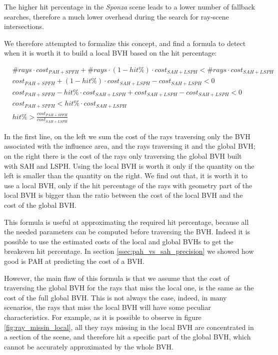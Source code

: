\documentclass{PoliMi_MasterThesis}
\begin{document}
The higher hit percentage in the \textit{Sponza} scene leads to a lower number of fallback searches, therefore a much lower overhead during the search for ray-scene intersections.

We therefore attempted to formalize this concept, and find a formula to detect when it is worth it to build a local BVH based on the hit percentage:

\begin{subequations}
	\begin{align*}
		&\#rays \cdot cost_{PAH+SPFH} + \#rays \cdot (1-hit\%) \cdot cost_{SAH+LSPH} < \#rays \cdot cost_{SAH+LSPH}\\
		&cost_{PAH+SPFH} + (1-hit\%) \cdot cost_{SAH+LSPH} - cost_{SAH+LSPH} < 0\\
		&cost_{PAH+SPFH} - hit\% \cdot cost_{SAH+LSPH} + cost_{SAH+LSPH} - cost_{SAH+LSPH} < 0\\
		&cost_{PAH+SPFH} < hit\% \cdot cost_{SAH+LSPH}\\
		&hit\% > \frac{cost_{PAH+SPFH}}{cost_{SAH+LSPH}}
	\end{align*}
\end{subequations}

In the first line, on the left we sum the cost of the rays traversing only the BVH associated with the influence area, and the rays traversing it and the global BVH; on the right there is the cost of the rays only traversing the global BVH built with SAH and LSPH. Using the local BVH is worth it only if the quantity on the left is smaller than the quantity on the right. We find out that, it is worth it to use a local BVH, only if the hit percentage of the rays with geometry part of the local BVH is bigger than the ratio between the cost of the local BVH and the cost of the global BVH.

This formula is useful at approximating the required hit percentage, because all the needed parameters can be computed before traversing the BVH. Indeed it is possible to use the estimated costs of the local and global BVHs to get the breakeven hit percentage. In section \ref{ssec:pah_vs_sah_precision} we showed how good is PAH at predicting the cost of a BVH.

However, the main flaw of this formula is that we assume that the cost of traversing the global BVH for the rays that miss the local one, is the same as the cost of the full global BVH. This is not always the case, indeed, in many scenarios, the rays that miss the local BVH will have some peculiar characteristics. For example, as it is possible to observe in figure \ref{fig:ray_missin_local}, all they rays missing in the local BVH are concentrated in a section of the scene, and therefore hit a specific part of the global BVH, which cannot be accurately approximated by the whole BVH.
\end{document}
